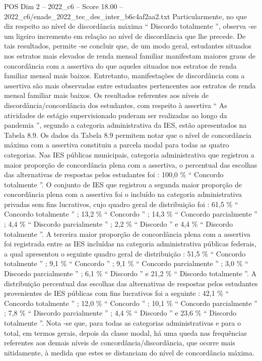\begin{textsample}{POS Dim 2 – 2022\_c6 – Score 18.00 – 2022\_c6/enade\_2022\_tec\_des\_inter\_b6c4af2aa2.txt}
Particularmente, no que diz respeito ao nível de discordância máxima “ Discordo totalmente ”, observa -se um ligeiro incremento em relação ao nível de discordância que lhe precede.
De tais resultados, permite -se concluir que, de um modo geral, estudantes situados nos estratos mais elevados de renda mensal familiar manifestam maiores graus de concordância com a assertiva do que aqueles situados nos estratos de renda familiar mensal mais baixos.
Entretanto, manifestações de discordância com a assertiva são mais observadas entre estudantes pertencentes aos estratos de renda mensal familiar mais baixos.
Os resultados referentes aos níveis de discordância/concordância dos estudantes, com respeito à assertiva “ As atividades de estágio supervisionado puderam ser realizadas ao longo da pandemia ”, segundo a categoria administrativa da IES, estão apresentados na Tabela 8.9.
Os dados da Tabela 8.9 permitem notar que o nível de concordância máxima com a assertiva constituiu a parcela modal para todas as quatro categorias.
Nas IES públicas municipais, categoria administrativa que registrou a maior proporção de concordância plena com a assertiva, o percentual das escolhas das alternativas de respostas pelos estudantes foi : 100,0 \% “ Concordo totalmente ”.
O conjunto de IES que registrou a segunda maior proporção de concordância plena com a assertiva foi o incluído na categoria administrativa privadas sem fins lucrativos, cujo quadro geral de distribuição foi : 61,5 \% “ Concordo totalmente ” ; 13,2 \% “ Concordo ” ; 14,3 \% “ Concordo parcialmente ” ; 4,4 \% “ Discordo parcialmente ” ; 2,2 \% “ Discordo ” e 4,4 \% “ Discordo totalmente ”.
A terceira maior proporção de concordância plena com a assertiva foi registrada entre as IES incluídas na categoria administrativa públicas federais, a qual apresentou o seguinte quadro geral de distribuição : 51,5 \% “ Concordo totalmente ” ; 9,1 \% “ Concordo ” ; 9,1 \% “ Concordo parcialmente ” ; 3,0 \% “ Discordo parcialmente ” ; 6,1 \% “ Discordo ” e 21,2 \% “ Discordo totalmente ”.
A distribuição percentual das escolhas das alternativas de respostas pelos estudantes provenientes de IES públicas com fins lucrativos foi a seguinte : 42,1 \% “ Concordo totalmente ” ; 12,0 \% “ Concordo ” ; 10,1 \% “ Concordo parcialmente ” ; 7,8 \% “ Discordo parcialmente ” ; 4,4 \% “ Discordo ” e 23,6 \% “ Discordo totalmente ”.
Nota -se que, para todas as categorias administrativas e para o total, em termos gerais, depois da classe modal, há uma queda nas frequências referentes aos demais níveis de concordância/discordância, que ocorre mais nitidamente, à medida que estes se distanciam do nível de concordância máxima.

\end{textsample}
